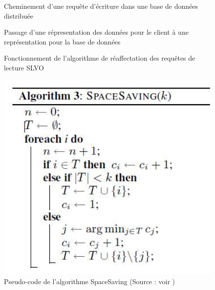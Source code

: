 \documentclass[12pt]{article}
\begin{document}
\begin{figure}[H]
	\centering
		
	\caption{Cheminement d'une requête d'écriture dans une base de données distribuée\label{fig:write_request}}
\end{figure}

\begin{figure}[H]
	\centering
		
	\caption{Passage d'une répresentation des données pour le client à une représentation pour la base de données\label{fig:token}}
\end{figure}

\begin{figure}[H]
	\centering
		
	\caption{Fonctionnement de l'algorithme de réaffectation des requêtes de lecture SLVO\label{fig:reaffectation}}
\end{figure}

\begin{figure}[H]
	\centering
        \includegraphics[width=12cm]{images/besoins/code_spaceSaving.jpg}
    \caption{Pseudo-code de l'algorithme SpaceSaving (Source : voir \cite{SpaceSaving2}) \label{fig:codeSpaceSaving}}
\end{figure}
\end{document}
